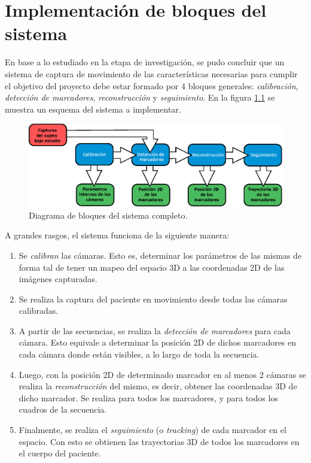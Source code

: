 \chapter{Implementación de bloques del sistema}
\label{sec:implementacion_bloques_sistema}


En base a lo estudiado en la etapa de investigación, se pudo concluir que un sistema de captura de movimiento de las características necesarias para cumplir el objetivo del proyecto debe estar formado por 4 bloques generales: \emph{calibración}, \emph{detección de marcadores}, \emph{reconstrucción} y \emph{seguimiento}. En la figura \ref{bloquesSist} se muestra un esquema del sistema a implementar.

\begin{figure}[H]
\hspace{-0.5cm}
\includegraphics[scale=0.7]{img/Sistema_completo/Diagrama_de_bloques.eps}
\caption{Diagrama de bloques del sistema completo.}
\label{bloquesSist}
\end{figure}

A grandes rasgos, el sistema funciona de la siguiente manera:

\begin{enumerate}
	\item Se \emph{calibran} las cámaras. Esto es, determinar los parámetros de las mismas de forma tal de tener un mapeo del espacio 3D a las coordenadas 2D de las imágenes capturadas.
	\item Se realiza la captura del paciente en movimiento desde todas las cámaras calibradas.
	\item A partir de las secuencias, se realiza la \emph{detección de marcadores} para cada cámara. Esto equivale a determinar la posición 2D de dichos marcadores en cada cámara donde están visibles, a lo largo de toda la secuencia.
	\item Luego, con la posición 2D de determinado marcador en al menos 2 cámaras se realiza la \emph{reconstrucción} del mismo, es decir, obtener las coordenadas 3D de dicho marcador. Se realiza para todos los marcadores, y para todos los cuadros de la secuencia.
	\item Finalmente, se realiza el \emph{seguimiento} (o \emph{tracking}) de cada marcador en el espacio. Con esto se obtienen las trayectorias 3D de todos los marcadores en el cuerpo del paciente.
\end{enumerate}

